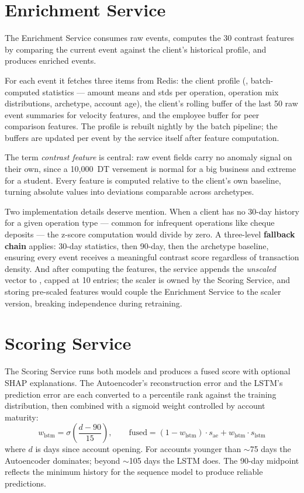 \section{Enrichment Service}

The Enrichment Service consumes raw events, computes the 30 contrast features by comparing the current event against the client's historical profile, and produces enriched events.

For each event it fetches three items from Redis: the client profile (, batch-computed statistics --- amount means and stds per operation, operation mix distributions, archetype, account age), the client's rolling buffer of the last 50 raw event summaries for velocity features, and the employee buffer for peer comparison features. The profile is rebuilt nightly by the batch pipeline; the buffers are updated per event by the service itself after feature computation.

The term \emph{contrast feature} is central: raw event fields carry no anomaly signal on their own, since a 10{,}000~DT versement is normal for a big business and extreme for a student. Every feature is computed relative to the client's own baseline, turning absolute values into deviations comparable across archetypes.

Two implementation details deserve mention. When a client has no 30-day history for a given operation type --- common for infrequent operations like cheque deposits --- the z-score computation would divide by zero. A three-level \textbf{fallback chain} applies: 30-day statistics, then 90-day, then the archetype baseline, ensuring every event receives a meaningful contrast score regardless of transaction density. And after computing the features, the service appends the \emph{unscaled} vector to , capped at 10 entries; the scaler is owned by the Scoring Service, and storing pre-scaled features would couple the Enrichment Service to the scaler version, breaking independence during retraining.

\section{Scoring Service}

The Scoring Service runs both models and produces a fused score with optional SHAP explanations. The Autoencoder's reconstruction error and the LSTM's prediction error are each converted to a percentile rank against the training distribution, then combined with a sigmoid weight controlled by account maturity:
\[
w_{\text{lstm}} = \sigma\!\left(\frac{d - 90}{15}\right), \qquad
\text{fused} = (1 - w_{\text{lstm}}) \cdot s_{\text{ae}} + w_{\text{lstm}} \cdot s_{\text{lstm}}
\]
where $d$ is days since account opening. For accounts younger than $\sim$75 days the Autoencoder dominates; beyond $\sim$105 days the LSTM does. The 90-day midpoint reflects the minimum history for the sequence model to produce reliable predictions.

